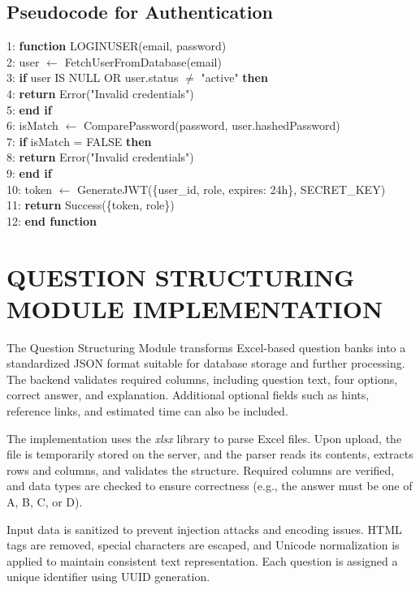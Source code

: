 \begin{sloppypar}
\subsection{Pseudocode for Authentication}

1: \textbf{function} LOGINUSER(email, password)\\
2: \quad user $\leftarrow$ FetchUserFromDatabase(email)\\
3: \quad \textbf{if} user IS NULL OR user.status $\neq$ "active" \textbf{then}\\
4: \qquad \textbf{return} Error("Invalid credentials")\\
5: \quad \textbf{end if}\\
6: \quad isMatch $\leftarrow$ ComparePassword(password, user.hashedPassword)\\
7: \quad \textbf{if} isMatch = FALSE \textbf{then}\\
8: \qquad \textbf{return} Error("Invalid credentials")\\
9: \quad \textbf{end if}\\
10: \quad token $\leftarrow$ GenerateJWT(\{user\_id, role, expires: 24h\}, SECRET\_KEY)\\
11: \quad \textbf{return} Success(\{token, role\})\\
12: \textbf{end function}
\algofooter

\section{\MakeUppercase{QUESTION STRUCTURING MODULE IMPLEMENTATION}}

The Question Structuring Module transforms Excel-based question banks into a standardized JSON format suitable for database storage and further processing. The backend validates required columns, including question text, four options, correct answer, and explanation. Additional optional fields such as hints, reference links, and estimated time can also be included.

The implementation uses the \textit{xlsx} library to parse Excel files. Upon upload, the file is temporarily stored on the server, and the parser reads its contents, extracts rows and columns, and validates the structure. Required columns are verified, and data types are checked to ensure correctness (e.g., the answer must be one of A, B, C, or D).

Input data is sanitized to prevent injection attacks and encoding issues. HTML tags are removed, special characters are escaped, and Unicode normalization is applied to maintain consistent text representation. Each question is assigned a unique identifier using UUID generation.


\end{sloppypar}
